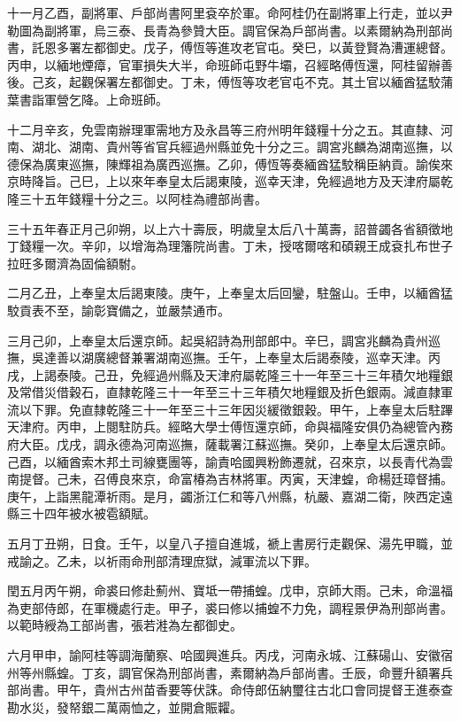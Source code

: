 \begin{pinyinscope}
十一月乙酉，副將軍、戶部尚書阿里袞卒於軍。命阿桂仍在副將軍上行走，並以尹勒圖為副將軍，烏三泰、長青為參贊大臣。調官保為戶部尚書。以素爾納為刑部尚書，託恩多署左都御史。戊子，傅恆等進攻老官屯。癸巳，以黃登賢為漕運總督。丙申，以緬地煙瘴，官軍損失大半，命班師屯野牛壩，召經略傅恆還，阿桂留辦善後。己亥，起觀保署左都御史。丁未，傅恆等攻老官屯不克。其土官以緬酋猛駮蒲葉書詣軍營乞降。上命班師。

十二月辛亥，免雲南辦理軍需地方及永昌等三府州明年錢糧十分之五。其直隸、河南、湖北、湖南、貴州等省官兵經過州縣並免十分之三。調宮兆麟為湖南巡撫，以德保為廣東巡撫，陳輝祖為廣西巡撫。乙卯，傅恆等奏緬酋猛駮稱臣納貢。諭俟來京時降旨。己巳，上以來年奉皇太后謁東陵，巡幸天津，免經過地方及天津府屬乾隆三十五年錢糧十分之三。以阿桂為禮部尚書。

三十五年春正月己卯朔，以上六十壽辰，明歲皇太后八十萬壽，詔普蠲各省額徵地丁錢糧一次。辛卯，以增海為理籓院尚書。丁未，授喀爾喀和碩親王成袞扎布世子拉旺多爾濟為固倫額駙。

二月乙丑，上奉皇太后謁東陵。庚午，上奉皇太后回鑾，駐盤山。壬申，以緬酋猛駮貢表不至，諭彰寶備之，並嚴禁通市。

三月己卯，上奉皇太后還京師。起吳紹詩為刑部郎中。辛巳，調宮兆麟為貴州巡撫，吳達善以湖廣總督兼署湖南巡撫。壬午，上奉皇太后謁泰陵，巡幸天津。丙戌，上謁泰陵。己丑，免經過州縣及天津府屬乾隆三十一年至三十三年積欠地糧銀及常借災借穀石，直隸乾隆三十一年至三十三年積欠地糧銀及折色銀兩。減直隸軍流以下罪。免直隸乾隆三十一年至三十三年因災緩徵銀穀。甲午，上奉皇太后駐蹕天津府。丙申，上閱駐防兵。經略大學士傅恆還京師，命與福隆安俱仍為總管內務府大臣。戊戌，調永德為河南巡撫，薩載署江蘇巡撫。癸卯，上奉皇太后還京師。己酉，以緬酋索木邦土司線甕團等，諭責哈國興粉飾遷就，召來京，以長青代為雲南提督。己未，召傅良來京，命富椿為吉林將軍。丙寅，天津蝗，命楊廷璋督捕。庚午，上詣黑龍潭祈雨。是月，蠲浙江仁和等八州縣，杭嚴、嘉湖二衛，陜西定遠縣三十四年被水被雹額賦。

五月丁丑朔，日食。壬午，以皇八子擅自進城，褫上書房行走觀保、湯先甲職，並戒諭之。乙未，以祈雨命刑部清理庶獄，減軍流以下罪。

閏五月丙午朔，命裘曰修赴薊州、寶坻一帶捕蝗。戊申，京師大雨。己未，命溫福為吏部侍郎，在軍機處行走。甲子，裘曰修以捕蝗不力免，調程景伊為刑部尚書。以範時綬為工部尚書，張若溎為左都御史。

六月甲申，諭阿桂等調海蘭察、哈國興進兵。丙戌，河南永城、江蘇碭山、安徽宿州等州縣蝗。丁亥，調官保為刑部尚書，素爾納為戶部尚書。壬辰，命豐升額署兵部尚書。甲午，貴州古州苗香要等伏誅。命侍郎伍納璽往古北口會同提督王進泰查勘水災，發帑銀二萬兩恤之，並開倉賑糶。


\end{pinyinscope}
